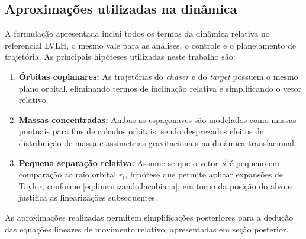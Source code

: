 \subsection{Aproximações utilizadas na dinâmica}
\label{sec:aprox_dinamica}
A formulação apresentada inclui todos os termos da dinâmica relativa no referencial LVLH, o mesmo vale para as análises, o controle e o planejamento de trajetória. 
As principais hipóteses utilizadas neste trabalho são:
\begin{enumerate}[label=\roman*.]
    \item \textbf{Órbitas coplanares:} As trajetórias do \emph{chaser} e do \emph{target} possuem o mesmo plano orbital, eliminando termos de inclinação relativa e simplificando o vetor relativo.
    
    \item \textbf{Massas concentradas:} Ambas as espaçonaves são modelados como massas pontuais para fins de calculos orbitais, sendo desprezados efeitos de distribuição de massa e assimetrias gravitacionais na dinâmica translacional.
    
    \item \textbf{Pequena separação relativa:} Assume-se que o vetor $\vec s$ é pequeno em comparação ao raio orbital $r_t$, hipótese que permite aplicar expansões de Taylor, conforme \eqref{eq:linearizandoJacobiana}, em torno da posição do alvo e justifica as linearizações subsequentes.
\end{enumerate}

As aproximações realizadas permitem simplificações posteriores para a dedução das equações lineares de movimento relativo, apresentadas em seção posterior.